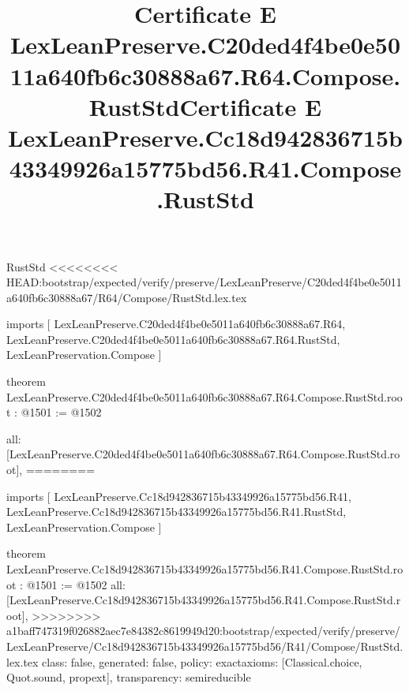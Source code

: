\begin{lexlean}{RustStd}
<<<<<<<< HEAD:bootstrap/expected/verify/preserve/LexLeanPreserve/C20ded4f4be0e5011a640fb6c30888a67/R64/Compose/RustStd.lex.tex
\title{Certificate E LexLeanPreserve.C20ded4f4be0e5011a640fb6c30888a67.R64.Compose.RustStd}
\begin{coremodule}
imports [
  LexLeanPreserve.C20ded4f4be0e5011a640fb6c30888a67.R64,
  LexLeanPreserve.C20ded4f4be0e5011a640fb6c30888a67.R64.RustStd,
  LexLeanPreservation.Compose
]

theorem LexLeanPreserve.C20ded4f4be0e5011a640fb6c30888a67.R64.Compose.RustStd.root : @1501 := @1502 {
  all: [LexLeanPreserve.C20ded4f4be0e5011a640fb6c30888a67.R64.Compose.RustStd.root],
========
\title{Certificate E LexLeanPreserve.Cc18d942836715b43349926a15775bd56.R41.Compose.RustStd}
\begin{coremodule}
imports [
  LexLeanPreserve.Cc18d942836715b43349926a15775bd56.R41,
  LexLeanPreserve.Cc18d942836715b43349926a15775bd56.R41.RustStd,
  LexLeanPreservation.Compose
]

theorem LexLeanPreserve.Cc18d942836715b43349926a15775bd56.R41.Compose.RustStd.root : @1501 := @1502 {
  all: [LexLeanPreserve.Cc18d942836715b43349926a15775bd56.R41.Compose.RustStd.root],
>>>>>>>> a1baff747319f026882aec7e84382c8619949d20:bootstrap/expected/verify/preserve/LexLeanPreserve/Cc18d942836715b43349926a15775bd56/R41/Compose/RustStd.lex.tex
  class: false,
  generated: false,
  policy: exact{axioms: [Classical.choice, Quot.sound, propext]},
  transparency: semireducible
}


\end{coremodule}}
\end{coremodule}
\end{lexlean}
